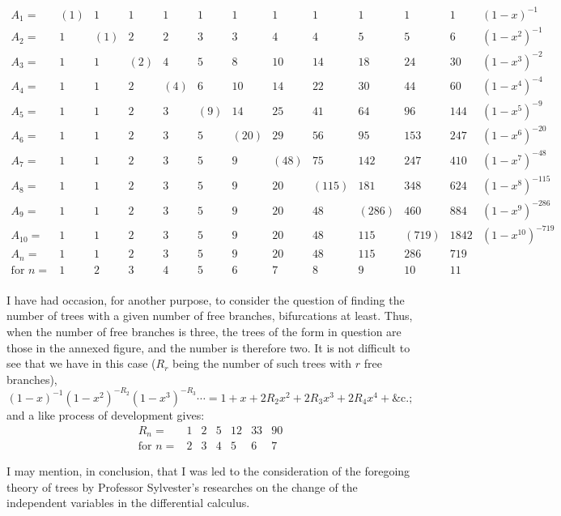 \documentclass[11pt,a4paper]{book}
\begin{document}
\[
\begin{array}{c|*{11}{c}|c}
A_1 = & (1) & 1 & 1 & 1 & 1 & 1 & 1 & 1 & 1 & 1 & 1 & (1-x)^{-1}\\
A_2 = & 1 & (1) & 2 & 2 & 3 & 3 & 4 & 4 & 5 & 5 & 6 & (1-x^2)^{-1}\\
A_3 = & 1 & 1 & (2) & 4 & 5 & 8 & 10 & 14 & 18 & 24 & 30 & (1-x^3)^{-2}\\
A_4 = & 1 & 1 & 2 & (4) & 6 & 10 & 14 & 22 & 30 & 44 & 60 & (1-x^4)^{-4}\\
A_5 = & 1 & 1 & 2 & 3 & (9) & 14 & 25 & 41 & 64 & 96 & 144 & (1-x^5)^{-9}\\
A_6 = & 1 & 1 & 2 & 3 & 5 & (20) & 29 & 56 & 95 & 153 & 247 & (1-x^6)^{-20}\\
A_7 = & 1 & 1 & 2 & 3 & 5 & 9 & (48) & 75 & 142 & 247 & 410 & (1-x^7)^{-48}\\
A_8 = & 1 & 1 & 2 & 3 & 5 & 9 & 20 & (115) & 181 & 348 & 624 & (1-x^8)^{-115}\\
A_9 = & 1 & 1 & 2 & 3 & 5 & 9 & 20 & 48 & (286) & 460 & 884 & (1-x^9)^{-286}\\
A_{10} = & 1 & 1 & 2 & 3 & 5 & 9 & 20 & 48 & 115 & (719) & 1842 & (1-x^{10})^{-719}\\
\hline
A_n = & 1 & 1 & 2 & 3 & 5 & 9 & 20 & 48 & 115 & 286 & 719 & \\
\text{for } n = & 1 & 2 & 3 & 4 & 5 & 6 & 7 & 8 & 9 & 10 & 11 & \\
\end{array}
\]

I have had occasion, for another purpose, to consider the question of finding the
number of trees with a given number of free branches, bifurcations at least. Thus,
when the number of free branches is three, the trees of the form in question are
those in the annexed figure, and the number is therefore two. It is not difficult to
see that we have in this case ($R_r$ being the number of such trees with $r$ free branches),
\[
(1 - x)^{-1}(1 - x^2)^{-R_2}(1 - x^3)^{-R_3}\cdots = 1 + x + 2R_2 x^2 + 2R_3 x^3 + 2R_4 x^4 + \&\textrm{c.};
\]
and a like process of development gives:
\[
\begin{array}{c|cccccc}
R_n = & 1 & 2 & 5 & 12 & 33 & 90\\
\text{for } n = & 2 & 3 & 4 & 5 & 6 & 7
\end{array}
\]

I may mention, in conclusion, that I was led to the consideration of the foregoing
theory of trees by Professor Sylvester's researches on the change of the independent
variables in the differential calculus.
\end{document}
